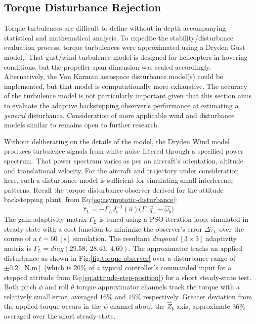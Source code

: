 \subsection{Torque Disturbance Rejection}
\label{subsec:simulation.disturbance.torque}
Torque turbulences are difficult to define without in-depth accompanying statistical and mathematical analysis. To expedite the stability/disturbance evaluation process, torque turbulences were approximated using a Dryden Gust model,\cite{optimalgust,discretegustmodel}. That gust/wind turbulence model is designed for helicopters in hovering conditions, but the propeller span dimension was scaled accordingly. Alternatively, the Von Karman aerospace disturbance model(s) could be implemented, but that model is computationally more exhaustive. The accuracy of the turbulence model is not particularly important given that this section aims to evaluate the adaptive backstepping observer's performance at estimating a \emph{general} disturbance. Consideration of more applicable wind and disturbance models similar to \cite{nonlineardynamics} remains open to further research.
\par
Without deliberating on the details of the model, the Dryden Wind model produces turbulence signals from white noise filtered through a specified power spectrum. That power spectrum varies as per an aircraft's orientation, altitude and translational velocity. For the aircraft and trajectory under consideration here, such a disturbance model is sufficient for simulating small interference patterns. Recall the torque disturbance observer derived for the attitude backstepping plant, from Eq:\ref{eq:asymptotic-disturbance}:
\begin{equation}\label{eq:stability-torque-overserver}
\dot{\hat{\tau}}_L=-\Gamma_L J_b^{-1}(\hat{u})\big(\Gamma_1\vec{q}_e-\hat{\omega_b}\big)
\end{equation}
The gain adaptivity matrix $\Gamma_L$ is tuned using a PSO iteration loop, simulated in steady-state with a cost function to minimize the observer's error $\Delta\hat{\tau}_L$ over the course of a $t=60~[\text{s}]$ simulation. The resultant \emph{diagonal} $[3\times 3]$ adaptivity matrix is $\Gamma_L=diag(29.58,~28.43,~4.60)$. The approximator tracks an applied disturbance as shown in Fig:\ref{fig:torque-observer} over a disturbance range of $\pm 0.2~[\text{N.m}]$ (which is 20\% of a typical controller's commanded input for a stepped attitude from Eq:\ref{eq:attitude-step-position}) for a short steady-state test. Both pitch $\phi$ and roll $\theta$ torque approximator channels track the torque with a relatively small error, averaged $16\%$ and $15\%$ respectively. Greater deviation from the applied torque occurs in the $\psi$ channel about the $\hat{Z}_b$ axis, approximate $36\%$ averaged over the short steady-state.
